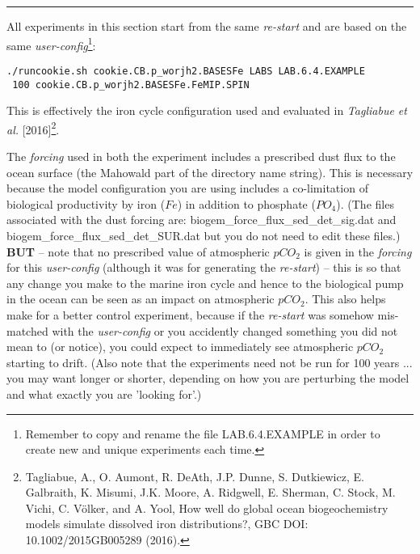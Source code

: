 \vspace{1mm} \noindent\rule{4cm}{0.1mm} \vspace{2mm}

\newpage

\noindent All experiments in this section start from the same \textit{re-start} and are based on the same \textit{user-config}\footnote{Remember to copy and rename the file \textsf{\footnotesize LAB.6.4.EXAMPLE} in order to create new and unique experiments each time.}:
\vspace{-2mm}\small\begin{verbatim}
./runcookie.sh cookie.CB.p_worjh2.BASESFe LABS LAB.6.4.EXAMPLE
 100 cookie.CB.p_worjh2.BASESFe.FeMIP.SPIN
\end{verbatim}\normalsize\vspace{-1mm}
This is effectively the iron cycle configuration used and evaluated in \textit{Tagliabue et al.} [2016]\footnote{Tagliabue, A., O. Aumont, R. DeAth, J.P. Dunne, S. Dutkiewicz, E. Galbraith, K. Misumi, J.K. Moore, A. Ridgwell, E. Sherman, C. Stock, M. Vichi, C. Völker, and A. Yool, How well do global ocean biogeochemistry models simulate dissolved iron distributions?, GBC DOI: 10.1002/2015GB005289 (2016).}.

\vspace{1mm}
The \textit{forcing} used in both the experiment includes a prescribed dust flux to the ocean surface (the \textsf{\footnotesize Mahowald} part of the directory name string). This is necessary because the model configuration you are using includes a co-limitation of biological productivity by iron (\(Fe\)) in addition to phosphate (\(PO_{4}\)). (The files associated with the dust forcing are: \textsf{\footnotesize biogem\_force\_flux\_sed\_det\_sig.dat} and \textsf{\footnotesize biogem\_force\_flux\_sed\_det\_SUR.dat} but you do not need to edit these files.) \textbf{BUT} -- note that no prescribed value of atmospheric \(pCO_{2}\) is given in the \textit{forcing} for this \textit{user-config} (although it was for generating the \textit{re-start}) -- this is so that any change you make to the marine iron cycle and hence to the biological pump in the ocean can be seen as an impact on atmospheric \(pCO_{2}\). This also helps make for a better control experiment, because if the \textit{re-start} was somehow mis-matched with the \textit{user-config}  or you accidently changed something you did not mean to (or notice), you could expect to immediately see atmospheric \(pCO_{2}\) starting to drift. (Also note that the experiments need not be run for 100 years ... you may want longer or shorter, depending on how you are perturbing the model and what exactly you are 'looking for'.)

